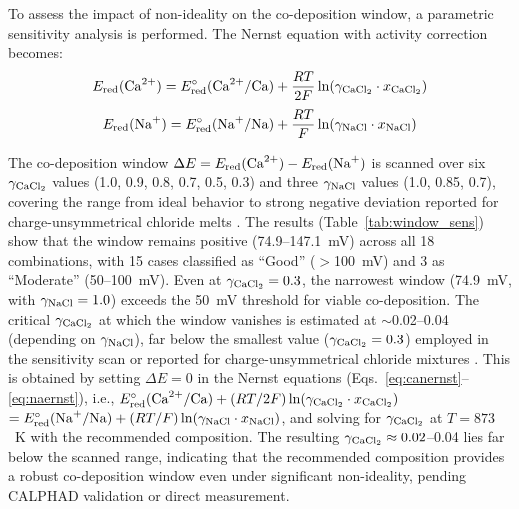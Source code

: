 \documentclass[pdflatex,sn-basic,Numbered]{sn-jnl}
\begin{document}
To assess the impact of non-ideality on the co-deposition window, a parametric sensitivity analysis is performed. The Nernst equation with activity correction becomes:
\begin{equation}
\label{eq:canernst}
E_{\mathrm{red}}(\ce{Ca^{2+}}) = E^{\circ}_{\mathrm{red}}(\ce{Ca^{2+}/Ca}) + \frac{RT}{2F}\ln(\gamma_{\ce{CaCl2}} \cdot x_{\ce{CaCl2}})
\end{equation}
\begin{equation}
\label{eq:naernst}
E_{\mathrm{red}}(\ce{Na+}) = E^{\circ}_{\mathrm{red}}(\ce{Na+/Na}) + \frac{RT}{F}\ln(\gamma_{\ce{NaCl}} \cdot x_{\ce{NaCl}})
\end{equation}

The co-deposition window $\Delta E = E_{\mathrm{red}}(\ce{Ca^{2+}}) - E_{\mathrm{red}}(\ce{Na+})$ is scanned over six $\gamma_{\ce{CaCl2}}$ values (1.0, 0.9, 0.8, 0.7, 0.5, 0.3) and three $\gamma_{\ce{NaCl}}$ values (1.0, 0.85, 0.7), covering the range from ideal behavior to strong negative deviation reported for charge-unsymmetrical chloride melts \cite{kleppa1966}. The results (Table~\ref{tab:window_sens}) show that the window remains positive (74.9--147.1~mV) across all 18 combinations, with 15 cases classified as ``Good'' ($>$100~mV) and 3 as ``Moderate'' (50--100~mV). Even at $\gamma_{\ce{CaCl2}} = 0.3$, the narrowest window (74.9~mV, with $\gamma_{\ce{NaCl}} = 1.0$) exceeds the 50~mV threshold for viable co-deposition. The critical $\gamma_{\ce{CaCl2}}$ at which the window vanishes is estimated at $\sim$0.02--0.04 (depending on $\gamma_{\ce{NaCl}}$), far below the smallest value ($\gamma_{\ce{CaCl2}} = 0.3$) employed in the sensitivity scan or reported for charge-unsymmetrical chloride mixtures \cite{chartrand2000,kleppa1966}. This is obtained by setting $\Delta E = 0$ in the Nernst equations (Eqs.~\ref{eq:canernst}--\ref{eq:naernst}), i.e., $E^{\circ}_{\mathrm{red}}(\ce{Ca^{2+}/Ca}) + (RT/2F)\ln(\gamma_{\ce{CaCl2}} \cdot x_{\ce{CaCl2}})$ $= E^{\circ}_{\mathrm{red}}(\ce{Na+/Na}) + (RT/F)\ln(\gamma_{\ce{NaCl}} \cdot x_{\ce{NaCl}})$, and solving for $\gamma_{\ce{CaCl2}}$ at $T = 873$~K with the recommended composition. The resulting $\gamma_{\ce{CaCl2}} \approx 0.02$--0.04 lies far below the scanned range, indicating that the recommended composition provides a robust co-deposition window even under significant non-ideality, pending CALPHAD validation or direct measurement.
\end{document}
